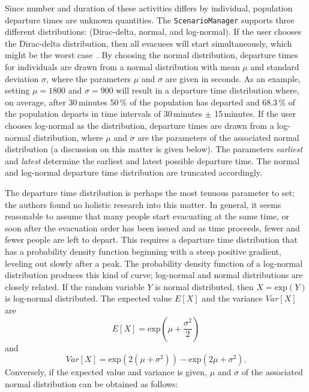 \begin{itemize}
Since number and duration of these activities differs by individual, population departure times are unknown quantities. The \lstinline|ScenarioManager| supports three different distributions: (Dirac-delta, normal, and log-normal). If the user chooses the Dirac-delta distribution, then all evacuees will start simultaneously, which might be the worst case~\citep{00LaemmelKluepfel2012InfluenceOfDepartureTimeDistribution}. By choosing the normal distribution, departure times for individuals are drawn from a normal distribution with mean $\mu$ and standard deviation $\sigma$, where the parameters $\mu$ and $\sigma$ are given in seconds. As an example, setting $\mu = 1800$ and $\sigma =  900$ will result in a departure time distribution where, on average, after 30\,minutes 50\,\% of the population has departed and 68.3\,\% of the population departs in time intervals of 30\,minutes $\pm$ 15\,minutes. If the user chooses log-normal as the distribution, departure times are drawn from a log-normal distribution, where $\mu$ and $\sigma$ are the parameters of the associated normal distribution (a discussion on this matter is given below). The parameters \emph{earliest} and \emph{latest} determine the earliest and latest possible departure time. The normal and log-normal departure time distribution are truncated accordingly.
\end{itemize}
%
The departure time distribution is perhaps the most tenuous parameter to set; the authors found no holistic research into this matter. 
In general, it seems reasonable to assume that many people start evacuating at the same time, or soon after the evacuation order has been issued and as time proceeds, fewer and fewer people are left to depart. 
This requires a departure time distribution that has a probability density function beginning with a steep positive gradient, leveling out slowly after a peak. The probability density function of a log-normal distribution produces this kind of curve; log-normal and normal distributions are closely related. If the random variable $Y$ is normal distributed, then $X = \text{exp}(Y)$ is log-normal distributed. The expected value $E[X]$ and the variance $Var[X]$ are
\begin{equation}
E[X] = \text{exp}(\mu + \frac{\sigma^2}{2})
\end{equation}
and 
\begin{equation}
Var[X]=\text{exp}(2(\mu+\sigma^2))-\text{exp}(2\mu+\sigma^2).
\end{equation}
Conversely, if the expected value and variance is given, $\mu$ and $\sigma$ of the associated normal distribution can be obtained as follows:
